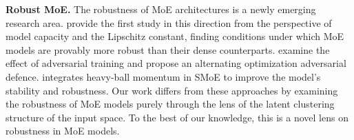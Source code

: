 \textbf{Robust MoE.} The robustness of MoE architectures is a newly emerging research area. \citet{puigcerver2022adversarial} provide the first study in this direction from the perspective of model capacity and the Lipschitz constant, finding conditions under which MoE models are provably more robust than their dense counterparts. \citet{zhang2023robust} examine the effect of adversarial training and propose an alternating optimization adversarial defence. \citet{teo2024momentumsmoe} integrates heavy-ball momentum in SMoE to improve the model’s stability and robustness. Our work differs from these approaches by examining the robustness of MoE models purely through the lens of the latent clustering structure of the input space. To the best of our knowledge, this is a novel lens on robustness in MoE models.
\vspace{-0.1in}




